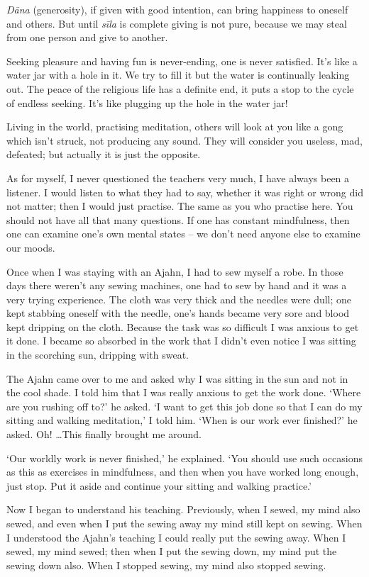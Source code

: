 \emph{Dāna} (generosity), if given with good intention, can bring
happiness to oneself and others. But until \emph{sīla} is complete
giving is not pure, because we may steal from one person and give to
another.

Seeking pleasure and having fun is never-ending, one is never satisfied.
It's like a water jar with a hole in it. We try to fill it but the water
is continually leaking out. The peace of the religious life has a
definite end, it puts a stop to the cycle of endless seeking. It's like
plugging up the hole in the water jar!

Living in the world, practising meditation, others will look at you like
a gong which isn't struck, not producing any sound. They will consider
you useless, mad, defeated; but actually it is just the opposite.

As for myself, I never questioned the teachers very much, I have always
been a listener. I would listen to what they had to say, whether it was
right or wrong did not matter; then I would just practise. The same as
you who practise here. You should not have all that many questions. If
one has constant mindfulness, then one can examine one's own mental
states -- we don't need anyone else to examine our moods.

Once when I was staying with an Ajahn, I had to sew myself a robe. In
those days there weren't any sewing machines, one had to sew by hand and
it was a very trying experience. The cloth was very thick and the
needles were dull; one kept stabbing oneself with the needle, one's
hands became very sore and blood kept dripping on the cloth. Because the
task was so difficult I was anxious to get it done. I became so absorbed
in the work that I didn't even notice I was sitting in the scorching
sun, dripping with sweat.

The Ajahn came over to me and asked why I was sitting in the sun and not
in the cool shade. I told him that I was really anxious to get the work
done. `Where are you rushing off to?' he asked. `I want to get this job
done so that I can do my sitting and walking meditation,' I told him.
`When is our work ever finished?' he asked. Oh! \ldots{}This finally
brought me around.

`Our worldly work is never finished,' he explained. `You should use such
occasions as this as exercises in mindfulness, and then when you have
worked long enough, just stop. Put it aside and continue your sitting
and walking practice.'

Now I began to understand his teaching. Previously, when I sewed, my
mind also sewed, and even when I put the sewing away my mind still kept
on sewing. When I understood the Ajahn's teaching I could really put the
sewing away. When I sewed, my mind sewed; then when I put the sewing
down, my mind put the sewing down also. When I stopped sewing, my mind
also stopped sewing.

